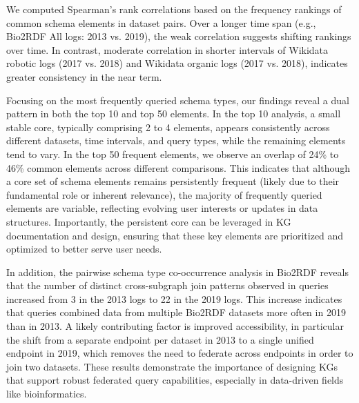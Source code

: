 \documentclass[sw]{iosart2x}
\begin{document}
We computed Spearman’s rank correlations based on the frequency rankings of common schema elements in dataset pairs. Over a longer time span (e.g., Bio2RDF All logs: 2013 vs. 2019), the weak correlation suggests shifting rankings over time. In contrast, moderate correlation in shorter intervals of Wikidata robotic logs (2017 vs. 2018) and Wikidata organic logs (2017 vs. 2018), indicates greater consistency in the near term.

Focusing on the most frequently queried schema types, our findings reveal a dual pattern in both the top 10 and top 50 elements. In the top 10 analysis, a small stable core, typically comprising 2 to 4 elements, appears consistently across different datasets, time intervals, and query types, while the remaining elements tend to vary. In the top 50 frequent elements, we observe an overlap of 24\% to 46\% common elements across different comparisons. This indicates that although a core set of schema elements remains persistently frequent (likely due to their fundamental role or inherent relevance), the majority of frequently queried elements are variable, reflecting evolving user interests or updates in data structures. Importantly, the persistent core can be leveraged in KG documentation and design, ensuring that these key elements are prioritized and optimized to better serve user needs.


In addition, the pairwise schema type co-occurrence analysis in Bio2RDF reveals that the number of distinct cross-subgraph join patterns observed in queries increased from 3 in the 2013 logs to 22 in the 2019 logs. This increase indicates that queries combined data from multiple Bio2RDF datasets more often in 2019 than in 2013. A likely contributing factor is improved accessibility, in particular the shift from a separate endpoint per dataset in 2013 to a single unified endpoint in 2019, which removes the need to federate across endpoints in order to join two datasets. These results demonstrate the importance of designing KGs that support robust federated query capabilities, especially in data-driven fields like bioinformatics.
\end{document}
